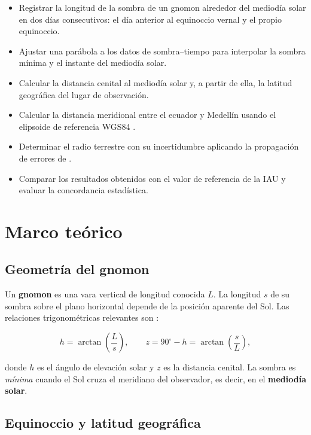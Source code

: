 \documentclass[12pt,a4paper]{article}
\begin{document}
\begin{itemize}
  \item Registrar la longitud de la sombra de un gnomon alrededor del
        mediodía solar en dos días consecutivos: el día anterior al
        equinoccio vernal y el propio equinoccio.
  \item Ajustar una parábola a los datos de sombra--tiempo para interpolar
        la sombra mínima y el instante del mediodía solar.
  \item Calcular la distancia cenital al mediodía solar y, a partir de
        ella, la latitud geográfica del lugar de observación.
  \item Calcular la distancia meridional entre el ecuador y Medellín
        usando el elipsoide de referencia WGS84 \citep{NGA2014}.
  \item Determinar el radio terrestre con su incertidumbre aplicando la
        propagación de errores de \citet{Baird1991}.
  \item Comparar los resultados obtenidos con el valor de referencia de
        la IAU y evaluar la concordancia estadística.
\end{itemize}

\section{Marco teórico}

\subsection{Geometría del gnomon}

Un \textbf{gnomon} es una vara vertical de longitud conocida $L$.
La longitud $s$ de su sombra sobre el plano horizontal depende de la
posición aparente del Sol.
Las relaciones trigonométricas relevantes son
\citep{PortillaBarbosa2009}:

\begin{equation}
  h = \arctan\!\left(\frac{L}{s}\right), \qquad
  z = 90^\circ - h = \arctan\!\left(\frac{s}{L}\right),
  \label{eq:angulos}
\end{equation}

donde $h$ es el ángulo de elevación solar y $z$ es la distancia
cenital.
La sombra es \emph{mínima} cuando el Sol cruza el meridiano del
observador, es decir, en el \textbf{mediodía solar}.

\subsection{Equinoccio y latitud geográfica}
\end{document}
